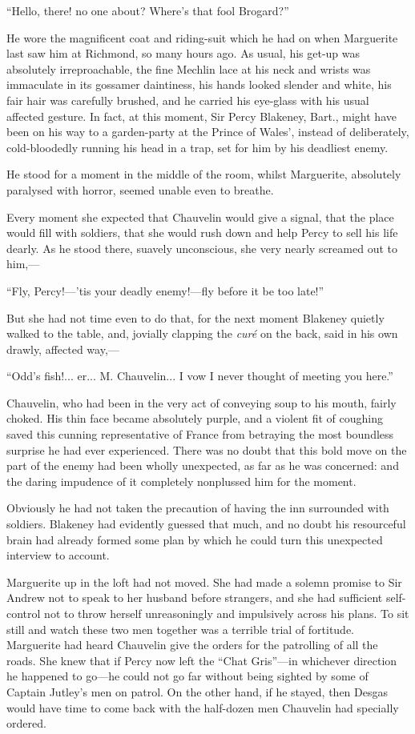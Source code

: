 \documentclass[paper=5.5in:8.5in,BCOR=7mm,twoside,DIV=calc,12pt,usegeometry,chapterprefix,endperiod,headings=big]{scrbook}
\begin{document}
\enquote{Hello, there! no one about? Where's that fool Brogard?}

He wore the magnificent coat and riding-suit which he had on when Marguerite last saw him at Richmond, so many hours ago. As usual, his get-up was absolutely irreproachable, the fine Mechlin lace at his neck and wrists was immaculate in its gossamer daintiness, his hands looked slender and white, his fair hair was carefully brushed, and he carried his eye-glass with his usual affected gesture. In fact, at this moment, Sir Percy Blakeney, Bart., might have been on his way to a garden-party at the Prince of Wales’, instead of deliberately, cold-bloodedly running his head in a trap, set for him by his deadliest enemy.

He stood for a moment in the middle of the room, whilst Marguerite, absolutely paralysed with horror, seemed unable even to breathe.

Every moment she expected that Chauvelin would give a signal, that the place would fill with soldiers, that she would rush down and help Percy to sell his life dearly. As he stood there, suavely unconscious, she very nearly screamed out to him,---

\enquote{Fly, Percy!---’tis your deadly enemy!---fly before it be too late!}

But she had not time even to do that, for the next moment Blakeney quietly walked to the table, and, jovially clapping the \textit{curé} on the back, said in his own drawly, affected way,---

\enquote{Odd's fish!... er... M. Chauvelin... I vow I never thought of meeting you here.}

Chauvelin, who had been in the very act of conveying soup to his mouth, fairly choked. His thin face became absolutely purple, and a violent fit of coughing saved this cunning representative of France from betraying the most boundless surprise he had ever experienced. There was no doubt that this bold move on the part of the enemy had been wholly unexpected, as far as he was concerned: and the daring impudence of it completely nonplussed him for the moment.

Obviously he had not taken the precaution of having the inn surrounded with soldiers. Blakeney had evidently guessed that much, and no doubt his resourceful brain had already formed some plan by which he could turn this unexpected interview to account.

Marguerite up in the loft had not moved. She had made a solemn promise to Sir Andrew not to speak to her husband before strangers, and she had sufficient self-control not to throw herself unreasoningly and impulsively across his plans. To sit still and watch these two men together was a terrible trial of fortitude. Marguerite had heard Chauvelin give the orders for the patrolling of all the roads. She knew that if Percy now left the \enquote{Chat Gris}---in whichever direction he happened to go---he could not go far without being sighted by some of Captain Jutley's men on patrol. On the other hand, if he stayed, then Desgas would have time to come back with the half-dozen men Chauvelin had specially ordered.
\end{document}
